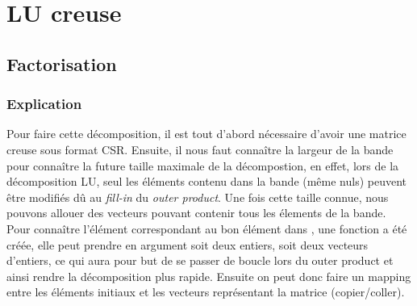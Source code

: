 \documentclass{article}[11pt]
\begin{document}
\section{LU creuse}
\label{sec:LUcsr}

\subsection{Factorisation}
\label{sub:LUfac}

\subsubsection{Explication}
\label{subsub:LUexp}

Pour faire cette décomposition, il est tout d'abord nécessaire d'avoir une matrice creuse sous format CSR. Ensuite, il nous faut connaître la largeur de la bande pour connaître la future taille maximale de la décompostion, en effet, lors de la décomposition LU, seul les éléments contenu dans la bande (même nuls) peuvent être modifiés dû au \textit{fill-in} du \textit{outer product}. Une fois cette taille connue, nous pouvons allouer des vecteurs pouvant contenir tous les élements de la bande. Pour connaître l'élément  correspondant au bon élément dans , une fonction  a été créée, elle peut prendre en argument soit deux entiers, soit deux vecteurs d'entiers, ce qui aura pour but de se passer de boucle lors du outer product et ainsi rendre la décomposition plus rapide. Ensuite on peut donc faire un mapping entre les éléments initiaux et les vecteurs représentant la matrice  (copier/coller).
\end{document}
